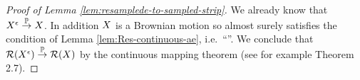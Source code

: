 {\begin{proof}[Proof of Lemma \ref{lem:resamplede-to-sampled-strip}]
  We already know that $X^{\epsilon} \overset{\mathbb{P}}\to X$.  In addition
  $X$ is a Brownian motion so almost surely
  satisfies the condition of Lemma \ref{lem:Res-continuous-ae}, i.e.\
  ``\stripleavetimenotturningpoint{\sampled}''.
  We conclude that $\mathcal{R}(X^{\epsilon}) \overset{\mathbb{P}}\to
  \mathcal{R}(X)$ by the continuous mapping theorem (see for
  example \cite{billingsley} Theorem 2.7).
\end{proof}
}
